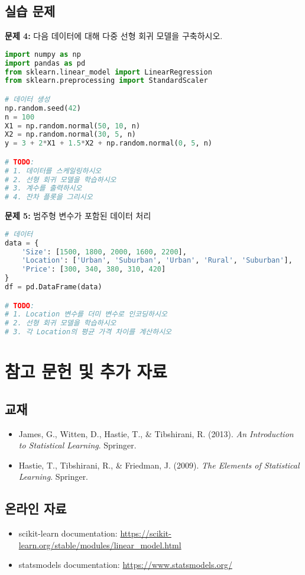 \documentclass[12pt]{article}
\begin{document}
\subsection{실습 문제}

\textbf{문제 4:} 다음 데이터에 대해 다중 선형 회귀 모델을 구축하시오.

\begin{lstlisting}[language=Python]
import numpy as np
import pandas as pd
from sklearn.linear_model import LinearRegression
from sklearn.preprocessing import StandardScaler

# 데이터 생성
np.random.seed(42)
n = 100
X1 = np.random.normal(50, 10, n)
X2 = np.random.normal(30, 5, n)
y = 3 + 2*X1 + 1.5*X2 + np.random.normal(0, 5, n)

# TODO:
# 1. 데이터를 스케일링하시오
# 2. 선형 회귀 모델을 학습하시오
# 3. 계수를 출력하시오
# 4. 잔차 플롯을 그리시오
\end{lstlisting}

\textbf{문제 5:} 범주형 변수가 포함된 데이터 처리

\begin{lstlisting}[language=Python]
# 데이터
data = {
    'Size': [1500, 1800, 2000, 1600, 2200],
    'Location': ['Urban', 'Suburban', 'Urban', 'Rural', 'Suburban'],
    'Price': [300, 340, 380, 310, 420]
}
df = pd.DataFrame(data)

# TODO:
# 1. Location 변수를 더미 변수로 인코딩하시오
# 2. 선형 회귀 모델을 학습하시오
# 3. 각 Location의 평균 가격 차이를 계산하시오
\end{lstlisting}

\section{참고 문헌 및 추가 자료}

\subsection{교재}
\begin{itemize}
    \item James, G., Witten, D., Hastie, T., \& Tibshirani, R. (2013). \textit{An Introduction to Statistical Learning}. Springer.
    \item Hastie, T., Tibshirani, R., \& Friedman, J. (2009). \textit{The Elements of Statistical Learning}. Springer.
\end{itemize}

\subsection{온라인 자료}
\begin{itemize}
    \item scikit-learn documentation: \url{https://scikit-learn.org/stable/modules/linear_model.html}
    \item statsmodels documentation: \url{https://www.statsmodels.org/}
\end{itemize}
\end{document}
